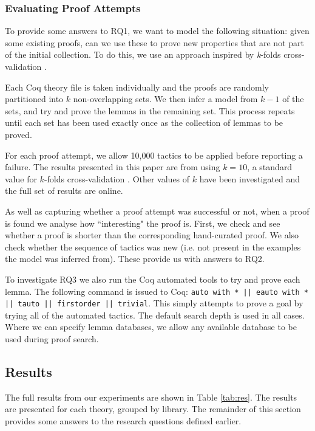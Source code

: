 \documentclass{llncs}
\begin{document}
\vspace{-3mm}

\subsubsection{Evaluating Proof Attempts}
To provide some answers to RQ1, we want to model the following situation: given some existing proofs, can we use these to prove new properties that are not part of the initial collection. To do this, we use an approach inspired by \emph{k}-folds cross-validation \cite{KohaviIJCAI}.

Each Coq theory file is taken individually and the proofs are randomly partitioned into $k$ non-overlapping sets. We then infer a model from $k-1$ of the sets, and try and prove the lemmas in the remaining set. This process repeats until each set has been used exactly once as the collection of lemmas to be proved.

For each proof attempt, we allow 10,000 tactics to be applied before reporting a failure. The results presented in this paper are from using $k=10$, a standard value for $k$-folds cross-validation \cite{KohaviIJCAI}. Other values of $k$ have been investigated and the full set of results are online.

As well as capturing whether a proof attempt was successful or not, when a proof is found we analyse how ``interesting" the proof is. First, we check and see whether a proof is shorter than the corresponding hand-curated proof. We also check whether the sequence of tactics was new (i.e. not present in the examples the model was inferred from). These provide us with answers to RQ2.

To investigate RQ3 we also run the Coq automated tools to try and prove each lemma. The following command is issued to Coq: \texttt{auto with * || eauto with * || tauto || firstorder || trivial}. This simply attempts to prove a goal by trying all of the automated tactics. The default search depth is used in all cases. Where we can specify lemma databases, we allow any available database to be used during proof search.

\subsection{Results}
The full results from our experiments are shown in Table \ref{tab:res}. The results are presented for each theory, grouped by library. The remainder of this section provides some answers to the research questions defined earlier.
\end{document}
